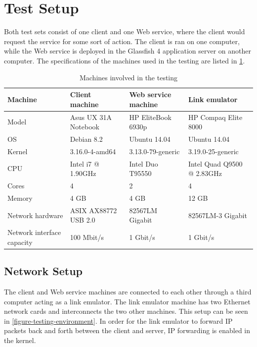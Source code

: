 \section{Test Setup}
\label{testing-environment}

Both test sets consist of one client and one Web service, where the client would
request the service for some sort of action. The client is ran on one computer,
while the Web service is deployed in the Glassfish 4 application server on
another computer. The specifications of the machines used in the testing are listed in
\cref{table-machines}.

\begin{table}[h]
\begin{tabularx}{\textwidth}{| X | X | X | X |}
\hline
  \textbf{Machine} & \textbf{Client machine} & \textbf{Web service machine} & \textbf{Link emulator}\\ \hline
  Model & Asus UX 31A Notebook & HP EliteBook 6930p & HP Compaq Elite 8000 \\ \hline
  OS & Debian 8.2 & Ubuntu 14.04 & Ubuntu 14.04\\ \hline
  Kernel & 3.16.0-4-amd64 & 3.13.0-79-generic & 3.19.0-25-generic\\ \hline
  CPU & Intel i7 @ 1.90GHz & Intel Duo T95550 & Intel Quad Q9500 @ 2.83GHz \\ \hline
  Cores & 4 & 2 & 4\\ \hline
  Memory & 4 GB & 4 GB & 12 GB\\ \hline
  Network hardware & ASIX AX88772 USB 2.0 & 82567LM Gigabit & 82567LM-3 Gigabit\\ \hline
  Network interface capacity & 100 Mbit/s & 1 Gbit/s & 1 Gbit/s \\ \hline
\end{tabularx}
\caption{Machines involved in the testing}
\label{table-machines}
\end{table}

\subsection{Network Setup}

The client and Web service machines are connected to each other through a third
computer acting as a link emulator. The link emulator machine has two Ethernet
network cards and interconnects the two other machines. This setup can be seen
in \cref{figure-testing-environment}. In order for the link emulator to forward
IP packets back and forth between the client and server, IP forwarding is
enabled in the kernel.

